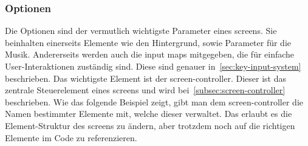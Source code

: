 \subsubsection{Optionen}\label{subsubsec:optionen}
\renewcommand{\kapitelautor}{Autor: Felix Zwickelstorfer}
Die Optionen sind der vermutlich wichtigste Parameter eines screens. 
Sie beinhalten einerseits Elemente wie den Hintergrund, sowie Parameter für die Musik.
Andererseits werden auch die input maps mitgegeben, die für einfache User-Interaktionen zuständig sind.
Diese sind genauer in~\ref{sec:key-input-system} beschrieben. 
Das wichtigste Element ist der screen-controller.
Dieser ist das zentrale Steuerelement eines screens und wird bei~\ref{subsec:screen-controller} beschrieben. 
Wie das folgende Beispiel zeigt, gibt man dem screen-controller die Namen bestimmter Elemente mit, welche dieser verwaltet. 
Das erlaubt es die Element-Struktur des screens zu ändern, aber trotzdem noch auf die richtigen Elemente im Code zu referenzieren.

